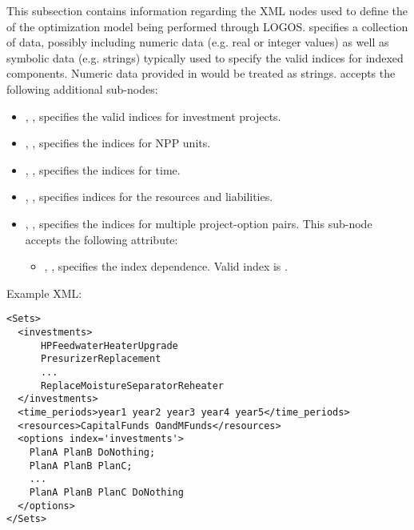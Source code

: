 This subsection contains information regarding the XML nodes used to define the
 of the optimization model being performed through LOGOS.
 specifies a collection of data, possibly including
numeric data (e.g. real or integer values) as well as symbolic data (e.g. strings)
typically used to specify the valid indices for indexed components.
\nb Numeric data provided in  would be treated as strings.
 accepts the following additional sub-nodes:
\begin{itemize}
  \item {}, , specifies
  the valid indices for investment projects.
  \item {}, ,
  specifies the indices for NPP units.
  \item {}, ,
  specifies the indices for time.
  \item {}, ,
  specifies indices for the resources and liabilities.
  \item {}, ,
  specifies the indices for multiple project-option pairs.
  This sub-node accepts the following attribute:
  \begin{itemize}
    \item {}, , specifies the index dependence.
    Valid index is .
  \end{itemize}
\end{itemize}

Example XML:
\begin{lstlisting}[style=XML]
<Sets>
  <investments>
      HPFeedwaterHeaterUpgrade
      PresurizerReplacement
      ...
      ReplaceMoistureSeparatorReheater
  </investments>
  <time_periods>year1 year2 year3 year4 year5</time_periods>
  <resources>CapitalFunds OandMFunds</resources>
  <options index='investments'>
    PlanA PlanB DoNothing;
    PlanA PlanB PlanC;
    ...
    PlanA PlanB PlanC DoNothing
  </options>
</Sets>
\end{lstlisting}

%
